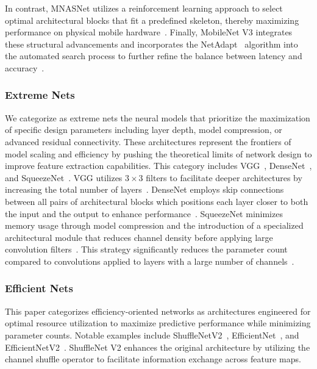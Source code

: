 \documentclass[final,3p,times,twocolumn]{elsarticle}
\begin{document}
In contrast, MNASNet utilizes a reinforcement learning approach to select optimal architectural blocks that fit a predefined skeleton, thereby maximizing performance on physical mobile hardware~\cite{MNASNet}.
Finally, MobileNet V3 integrates these structural advancements and incorporates the NetAdapt~\cite{NetAdapt} algorithm into the automated search process to further refine the balance between latency and accuracy~\cite{MobileNetV3}.

\subsubsection{Extreme Nets}

We categorize as extreme nets the neural models that prioritize the maximization of specific design parameters including layer depth, model compression, or advanced residual connectivity.
These architectures represent the frontiers of model scaling and efficiency by pushing the theoretical limits of network design to improve feature extraction capabilities.
This category includes VGG~\cite{VGG}, DenseNet~\cite{DenseNet}, and SqueezeNet~\cite{SqueezeNet}. VGG utilizes $3 \times 3$ filters to facilitate deeper architectures by increasing the total number of layers~\cite{VGG}.
DenseNet employs skip connections between all pairs of architectural blocks which positions each layer closer to both the input and the output to enhance performance~\cite{DenseNet}.
SqueezeNet minimizes memory usage through model compression and the introduction of a specialized architectural module that reduces channel density before applying large convolution filters~\cite{SqueezeNet}.
This strategy significantly reduces the parameter count compared to convolutions applied to layers with a large number of channels~\cite{SqueezeNet}.

\subsubsection{Efficient Nets}


This paper categorizes efficiency-oriented networks as architectures engineered for optimal resource utilization to maximize predictive performance while minimizing parameter counts.
Notable examples include ShuffleNetV2~\cite{ShuffleNetV2}, EfficientNet~\cite{EfficientNet}, and EfficientNetV2~\cite{EfficientNetV2}.
ShuffleNet V2 enhances the original architecture by utilizing the channel shuffle operator to facilitate information exchange across feature maps.
\end{document}

